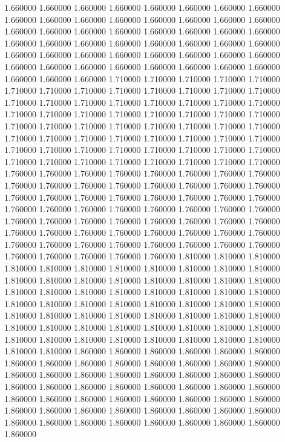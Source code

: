 1.660000
1.660000
1.660000
1.660000
1.660000
1.660000
1.660000
1.660000
1.660000
1.660000
1.660000
1.660000
1.660000
1.660000
1.660000
1.660000
1.660000
1.660000
1.660000
1.660000
1.660000
1.660000
1.660000
1.660000
1.660000
1.660000
1.660000
1.660000
1.660000
1.660000
1.660000
1.660000
1.660000
1.660000
1.660000
1.660000
1.660000
1.660000
1.660000
1.660000
1.660000
1.660000
1.660000
1.660000
1.660000
1.660000
1.660000
1.660000
1.660000
1.660000
1.660000
1.710000
1.710000
1.710000
1.710000
1.710000
1.710000
1.710000
1.710000
1.710000
1.710000
1.710000
1.710000
1.710000
1.710000
1.710000
1.710000
1.710000
1.710000
1.710000
1.710000
1.710000
1.710000
1.710000
1.710000
1.710000
1.710000
1.710000
1.710000
1.710000
1.710000
1.710000
1.710000
1.710000
1.710000
1.710000
1.710000
1.710000
1.710000
1.710000
1.710000
1.710000
1.710000
1.710000
1.710000
1.710000
1.710000
1.710000
1.710000
1.710000
1.710000
1.710000
1.710000
1.710000
1.710000
1.710000
1.710000
1.710000
1.710000
1.710000
1.710000
1.710000
1.760000
1.760000
1.760000
1.760000
1.760000
1.760000
1.760000
1.760000
1.760000
1.760000
1.760000
1.760000
1.760000
1.760000
1.760000
1.760000
1.760000
1.760000
1.760000
1.760000
1.760000
1.760000
1.760000
1.760000
1.760000
1.760000
1.760000
1.760000
1.760000
1.760000
1.760000
1.760000
1.760000
1.760000
1.760000
1.760000
1.760000
1.760000
1.760000
1.760000
1.760000
1.760000
1.760000
1.760000
1.760000
1.760000
1.760000
1.760000
1.760000
1.760000
1.760000
1.760000
1.760000
1.760000
1.760000
1.760000
1.760000
1.760000
1.760000
1.760000
1.760000
1.810000
1.810000
1.810000
1.810000
1.810000
1.810000
1.810000
1.810000
1.810000
1.810000
1.810000
1.810000
1.810000
1.810000
1.810000
1.810000
1.810000
1.810000
1.810000
1.810000
1.810000
1.810000
1.810000
1.810000
1.810000
1.810000
1.810000
1.810000
1.810000
1.810000
1.810000
1.810000
1.810000
1.810000
1.810000
1.810000
1.810000
1.810000
1.810000
1.810000
1.810000
1.810000
1.810000
1.810000
1.810000
1.810000
1.810000
1.810000
1.810000
1.810000
1.810000
1.810000
1.810000
1.810000
1.810000
1.810000
1.810000
1.810000
1.810000
1.810000
1.810000
1.860000
1.860000
1.860000
1.860000
1.860000
1.860000
1.860000
1.860000
1.860000
1.860000
1.860000
1.860000
1.860000
1.860000
1.860000
1.860000
1.860000
1.860000
1.860000
1.860000
1.860000
1.860000
1.860000
1.860000
1.860000
1.860000
1.860000
1.860000
1.860000
1.860000
1.860000
1.860000
1.860000
1.860000
1.860000
1.860000
1.860000
1.860000
1.860000
1.860000
1.860000
1.860000
1.860000
1.860000
1.860000
1.860000
1.860000
1.860000
1.860000
1.860000
1.860000
1.860000
1.860000
1.860000
1.860000
